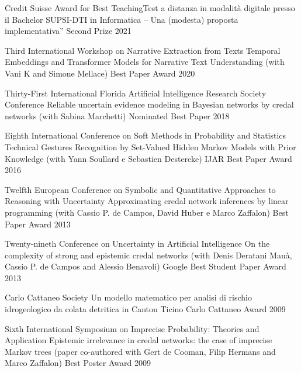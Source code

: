 \begin{cvhonors}
\cvhonor
{Credit Suisse Award for Best Teaching}{Test a distanza in modalità digitale presso il Bachelor SUPSI-DTI in Informatica – Una (modesta) proposta implementativa”}
{Second Prize}
{2021}

\cvhonor
{Third International Workshop on Narrative Extraction from Texts}
{Temporal Embeddings and Transformer Models for Narrative Text Understanding (with Vani K and Simone Mellace)}
{Best Paper Award}
{2020}

\cvhonor 
{Thirty-First International Florida Artificial Intelligence Research Society Conference}
{Reliable uncertain evidence modeling in Bayesian networks by credal networks (with Sabina Marchetti)}
{Nominated Best Paper}
{2018}

\cvhonor 
{Eighth International Conference on Soft Methods in Probability and Statistics}
{Technical Gestures Recognition by Set-Valued Hidden Markov Models with Prior Knowledge (with Yann Soullard e Sebastien Destercke)}
{IJAR Best Paper Award}
{2016}

\cvhonor
{Twelfth European Conference on Symbolic and Quantitative Approaches to Reasoning with Uncertainty}
{Approximating credal network inferences by linear programming (with Cassio P. de Campos, David Huber e Marco Zaffalon)}
{Best Paper Award}
{2013}

\cvhonor
{Twenty-nineth Conference on Uncertainty in Artificial Intelligence}
{On the complexity of strong and epistemic credal networks
(with Denis Deratani Mau\`a, Cassio P. de Campos and Alessio Benavoli)}
{Google Best Student Paper Award}
{2013}

\cvhonor
{Carlo Cattaneo Society}
{Un modello matematico per analisi di rischio idrogeologico da colata detritica in Canton Ticino}
{Carlo Cattaneo Award}
{2009}

\cvhonor
{Sixth International Symposium on Imprecise Probability: Theories and Application}
{Epistemic irrelevance in credal networks: the case of imprecise Markov trees (paper co-authored with Gert de Cooman, Filip Hermans and Marco Zaffalon)}
{Best Poster Award}
{2009}
\end{cvhonors}
\newpage
